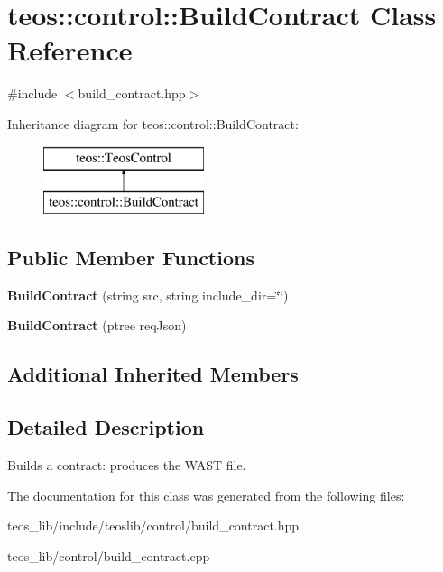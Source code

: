 \hypertarget{classteos_1_1control_1_1_build_contract}{}\section{teos\+:\+:control\+:\+:Build\+Contract Class Reference}
\label{classteos_1_1control_1_1_build_contract}


{\ttfamily \#include $<$build\+\_\+contract.\+hpp$>$}

Inheritance diagram for teos\+:\+:control\+:\+:Build\+Contract\+:\begin{figure}[H]
\begin{center}
\leavevmode
\includegraphics[height=2.000000cm]{classteos_1_1control_1_1_build_contract}
\end{center}
\end{figure}
\subsection*{Public Member Functions}
\begin{DoxyCompactItemize}
\item 
\mbox{\label{classteos_1_1control_1_1_build_contract_a4e421b3614f96648b714a00610839f56}} 
{\bfseries Build\+Contract} (string src, string include\+\_\+dir=\char`\"{}\char`\"{})
\item 
\mbox{\label{classteos_1_1control_1_1_build_contract_ac1bce2ea02bad0e31d3f7b9c06fef36e}} 
{\bfseries Build\+Contract} (ptree req\+Json)
\end{DoxyCompactItemize}
\subsection*{Additional Inherited Members}


\subsection{Detailed Description}
Builds a contract\+: produces the W\+A\+ST file. 

The documentation for this class was generated from the following files\+:\begin{DoxyCompactItemize}
\item 
teos\+\_\+lib/include/teoslib/control/build\+\_\+contract.\+hpp\item 
teos\+\_\+lib/control/build\+\_\+contract.\+cpp\end{DoxyCompactItemize}
